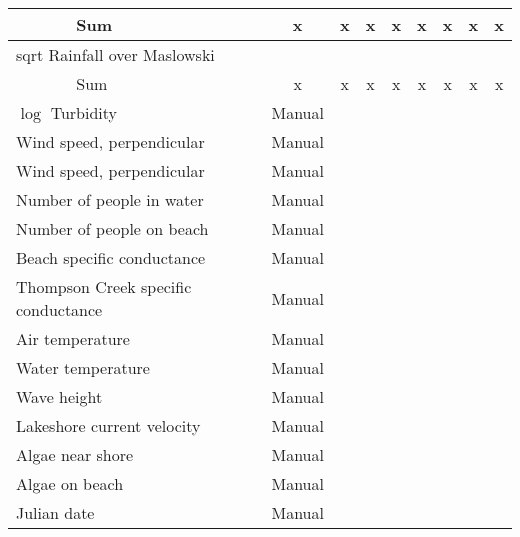 \begin{table}
{\begin{minipage}{\textwidth}
\begin{tabular}{ll|cccccccc}
        & Sum & x & x & x & x & x & x & x & x \\
        \hline
        \multicolumn{2}{l|}{sqrt Rainfall over Maslowski} &&&&&&&& \\
        & Sum & x & x & x & x & x & x & x & x \\
        \hline
        \multicolumn{2}{l|}{$\log$ Turbidity} & Manual&&&&&&& \\
        \hline
        \multicolumn{2}{l|}{Wind speed, perpendicular} & Manual&&&&&&& \\
        \hline
        \multicolumn{2}{l|}{Wind speed, perpendicular} & Manual&&&&&&& \\
        \hline
        \multicolumn{2}{l|}{Number of people in water} & Manual&&&&&&& \\
        \hline
        \multicolumn{2}{l|}{Number of people on beach} & Manual&&&&&&& \\
        \hline
        \multicolumn{2}{l|}{Beach specific conductance} & Manual&&&&&&& \\
        \hline
        \multicolumn{2}{l|}{Thompson Creek specific conductance} & Manual&&&&&&& \\
        \hline
        \multicolumn{2}{l|}{Air temperature} & Manual&&&&&&& \\
        \hline
        \multicolumn{2}{l|}{Water temperature} & Manual&&&&&&& \\
        \hline
        \multicolumn{2}{l|}{Wave height} & Manual&&&&&&& \\
        \hline
        \multicolumn{2}{l|}{Lakeshore current velocity} & Manual&&&&&&& \\
        \hline
        \multicolumn{2}{l|}{Algae near shore} & Manual&&&&&&& \\
        \hline
        \multicolumn{2}{l|}{Algae on beach} & Manual&&&&&&& \\
        \hline
        \multicolumn{2}{l|}{Julian date} & Manual&&&&&&& \\
        \hline
        \end{tabular}
        \end{minipage}}
\end{table}